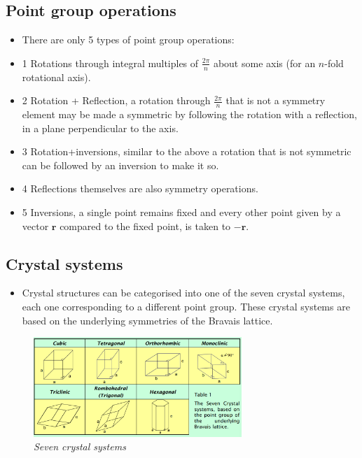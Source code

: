 \documentclass[11pt]{article}
\numberwithin{equation}{section}
\begin{document}
\subsection{Point group operations}
\begin{itemize}
    \item There are only 5 types of point group operations:

\item 1 Rotations through integral multiples of $\frac{2\pi}{n}$ about some axis (for an $n$-fold rotational axis). 

\item 2 Rotation + Reflection, a rotation through $\frac{2\pi}{n}$ that is not a symmetry element may be made a symmetric by following the rotation with a reflection, in a plane perpendicular to the axis. 

\item 3 Rotation+inversions, similar to the above a rotation that is not symmetric can be followed by an inversion to make it so. 

\item 4 Reflections themselves are also symmetry operations.

\item 5 Inversions, a single point remains fixed and every other point given by a vector $\textbf{r}$ compared to the fixed point, is taken to $-\textbf{r}$. 
\end{itemize}

\subsection{Crystal systems}
\begin{itemize}
    \item Crystal structures can be categorised into one of the seven crystal systems, each one corresponding to a different point group. These crystal systems are based on the underlying symmetries of the Bravais lattice. 
\end{itemize}


\begin{figure}[H]
\centering
\includegraphics[width=0.7\textwidth]{Graph7.png}
\caption{\label{fig:2}\emph{Seven crystal systems}}
\end{figure}
\end{document}
